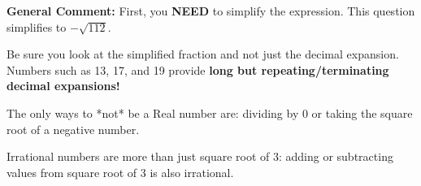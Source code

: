 \documentclass{extbook}[14pt]
\begin{document}
\begin{enumerate}
{\textbf{General Comment:} First, you \textbf{NEED} to simplify the expression. This question simplifies to $-\sqrt{112}$. 
 
 Be sure you look at the simplified fraction and not just the decimal expansion. Numbers such as 13, 17, and 19 provide \textbf{long but repeating/terminating decimal expansions!} 
 
 The only ways to *not* be a Real number are: dividing by 0 or taking the square root of a negative number. 
 
 Irrational numbers are more than just square root of 3: adding or subtracting values from square root of 3 is also irrational.
}
\end{enumerate}
\end{document}
